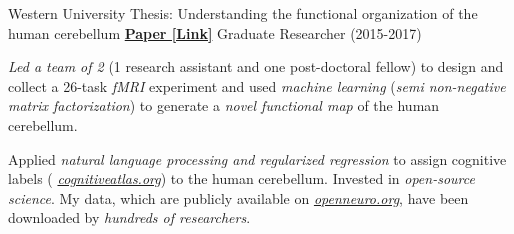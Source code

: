 \begin{cventries}
  \cventry
    {Western University} %
    {Thesis: Understanding the functional organization of the human cerebellum}
    {\href{http://ivrylab.berkeley.edu/uploads/4/1/1/5/41152143/functional_boundaries_in_the_human_cerebellum.pdf}{\textbf{Paper [Link]}}}
    {Graduate Researcher (2015-2017)} %
    {
      \begin{cvitems} %
      	\item {\textit{Led a team of 2} (1 research assistant and one post-doctoral fellow) to design and collect a 26-task \textit{fMRI} experiment and used \textit{machine learning} (\textit{semi non-negative matrix factorization}) to generate a \textit{novel functional map} of the human cerebellum.}
      	\item {Applied \textit{natural language processing and regularized regression} to assign cognitive labels ( {\href{https://cognitiveatlas.org/}{\textit{cognitiveatlas.org}}}) to the human cerebellum. Invested in \textit{open-source science}. My data, which are publicly available on {\href{https://openneuro.org/datasets/ds002105/versions/1.1.0}{\textit{openneuro.org}}}, have been downloaded by \textit{hundreds of researchers}.}
      \end{cvitems}
    }
\end{cventries}
